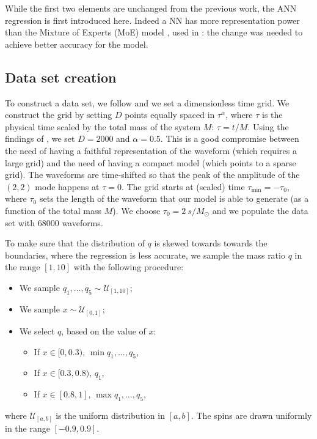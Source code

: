 \documentclass[twocolumn,showpacs,preprintnumbers,nofootinbib,prd,
superscriptaddress,10pt]{revtex4-1}
\begin{document}
While the first two elements are unchanged from the previous work, the ANN regression is first introduced here. Indeed a NN has more representation power than the Mixture of Experts (MoE) model \cite{Jacobs1991AdaptiveMoE}, used in \cite{Schmidt:2020yuu}: the change was needed to achieve better accuracy for the model.

\subsection{Data set creation}
\label{sec:data_set}

To construct a data set, we follow \cite{Schmidt:2020yuu} and we set a dimensionless time grid. We construct the grid 
by setting $D$ points equally spaced in $\tau^\alpha$, where $\tau$ is the physical time scaled by the total mass of 
the system $M$: $\tau = t/M$. Using the findings of \cite{Schmidt:2020yuu}, we set $D = \text{2000}$ and 
$\alpha = \text{0.5}$.
%
This is a good compromise between the need of having a faithful representation of the waveform (which requires 
a large grid) and the need of having a compact model (which points to a sparse grid).
%
The waveforms are time-shifted so that the peak of the amplitude of the $(2,2)$ mode happens at $\tau=0$. The grid starts at (scaled) time $\tau_\text{min} = -\tau_0$, where $\tau_0$ sets the length of the waveform that our model is able to generate (as a function of the total mass $M$).
We choose $\tau_0 = \SI{2}{s/M_\odot}$ and we populate the data set with $68000$ waveforms.

To make sure that the distribution of $q$ is skewed towards towards the boundaries, where the regression is less accurate, we sample the mass ratio $q$ in the range $[1,10]$ with the following procedure:
\begin{itemize}
	\item We sample $q_1, \hdots, q_5 \sim \mathcal{U}_{[1,10]}$;
	\item We sample $x \sim \mathcal{U}_{[0,1]}$;
	\item We select $q$, based on the value of $x$:
	\begin{itemize}
		\item If $x \in [0,0.3)$, $\min q_1, \hdots, q_5$,
		\item If $x \in [0.3, 0.8)$, $q_1$,
		\item If $x \in [0.8, 1]$, $\max q_1, \hdots, q_5$,
	\end{itemize}
\end{itemize}
where $\mathcal{U}_{[a,b]}$ is the uniform distribution in $[a,b]$.
The spins are drawn uniformly in the range $[-0.9, 0.9]$.
\end{document}
